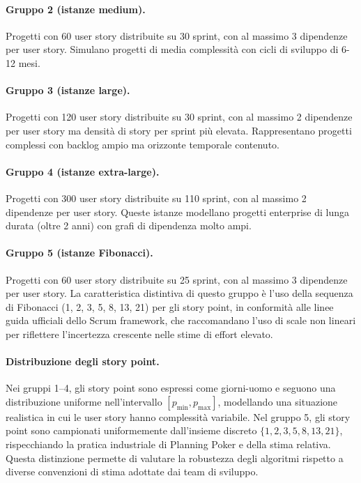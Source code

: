 \documentclass[12pt,a4paper,openright,twoside]{book}
\begin{document}
\paragraph{Gruppo 2 (istanze medium).}
Progetti con 60 user story distribuite su 30 sprint, con al massimo 3 dipendenze per user story. Simulano progetti di media complessità con cicli di sviluppo di 6-12 mesi.

\paragraph{Gruppo 3 (istanze large).}
Progetti con 120 user story distribuite su 30 sprint, con al massimo 2 dipendenze per user story ma densità di story per sprint più elevata. Rappresentano progetti complessi con backlog ampio ma orizzonte temporale contenuto.

\paragraph{Gruppo 4 (istanze extra-large).}
Progetti con 300 user story distribuite su 110 sprint, con al massimo 2 dipendenze per user story. Queste istanze modellano progetti enterprise di lunga durata (oltre 2 anni) con grafi di dipendenza molto ampi.

\paragraph{Gruppo 5 (istanze Fibonacci).}
Progetti con 60 user story distribuite su 25 sprint, con al massimo 3 dipendenze per user story. La caratteristica distintiva di questo gruppo è l'uso della sequenza di Fibonacci (1, 2, 3, 5, 8, 13, 21) per gli story point, in conformità alle linee guida ufficiali dello Scrum framework, che raccomandano l'uso di scale non lineari per riflettere l'incertezza crescente nelle stime di effort elevato.

\paragraph{Distribuzione degli story point.}
Nei gruppi 1--4, gli story point sono espressi come giorni-uomo e seguono una distribuzione uniforme nell'intervallo $[p_{\min}, p_{\max}]$, modellando una situazione realistica in cui le user story hanno complessità variabile. Nel gruppo 5, gli story point sono campionati uniformemente dall'insieme discreto $\{1, 2, 3, 5, 8, 13, 21\}$, rispecchiando la pratica industriale di Planning Poker e della stima relativa. Questa distinzione permette di valutare la robustezza degli algoritmi rispetto a diverse convenzioni di stima adottate dai team di sviluppo.
\end{document}
